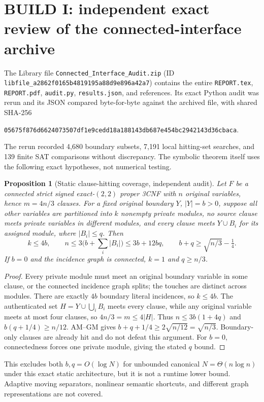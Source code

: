 \documentclass[11pt]{article}
\newtheorem{proposition}[theorem]{Proposition}
\begin{document}
\section{BUILD I: independent exact review of the connected-interface archive}
The Library file \texttt{Connected\_Interface\_Audit.zip} (ID \texttt{libfile\_a2862f0165b4819195a88d9e896a42a7}) contains the entire \texttt{REPORT.tex}, \texttt{REPORT.pdf}, \texttt{audit.py}, \texttt{results.json}, and references. Its exact Python audit was rerun and its JSON compared byte-for-byte against the archived file, with shared SHA-256
\begin{center}\small\texttt{05675f876d6624073507df1e9cedd18a188143db687e454bc2942143d36cbaca}.\end{center}
The rerun recorded 4,680 boundary subsets, 7,191 local hitting-set searches, and 139 finite SAT comparisons without discrepancy. The symbolic theorem itself uses the following exact hypotheses, not numerical testing.

\begin{proposition}[Static clause-hitting coverage, independent audit]
Let $F$ be a connected strict signed exact-$(2,2)$ proper 3CNF with $n$ original variables, hence $m=4n/3$ clauses. For a fixed original boundary $Y$, $|Y|=b>0$, suppose all other variables are partitioned into $k$ nonempty private modules, no source clause meets private variables in different modules, and every clause meets $Y\cup B_i$ for its assigned module, where $|B_i|\le q$. Then
\[
 k\le4b,\qquad n\le3\bigl(b+\textstyle\sum_i|B_i|\bigr)\le3b+12bq,
 \qquad b+q\ge\sqrt{n/3}-\tfrac14.
\]
If $b=0$ and the incidence graph is connected, $k=1$ and $q\ge n/3$.
\end{proposition}
\begin{proof}
Every private module must meet an original boundary variable in some clause, or the connected incidence graph splits; the touches are distinct across modules. There are exactly $4b$ boundary literal incidences, so $k\le4b$. The authenticated set $H=Y\cup\bigcup_i B_i$ meets every clause, while any original variable meets at most four clauses, so $4n/3=m\le4|H|$. Thus $n\le3b(1+4q)$ and $b(q+1/4)\ge n/12$. AM--GM gives $b+q+1/4\ge2\sqrt{n/12}=\sqrt{n/3}$. Boundary-only clauses are already hit and do not defeat this argument. For $b=0$, connectedness forces one private module, giving the stated $q$ bound.
\end{proof}
This excludes both $b,q=O(\log N)$ for unbounded canonical $N=\Theta(n\log n)$ under this exact static architecture, but it is not a runtime lower bound. Adaptive moving separators, nonlinear semantic shortcuts, and different graph representations are not covered.
\end{document}
